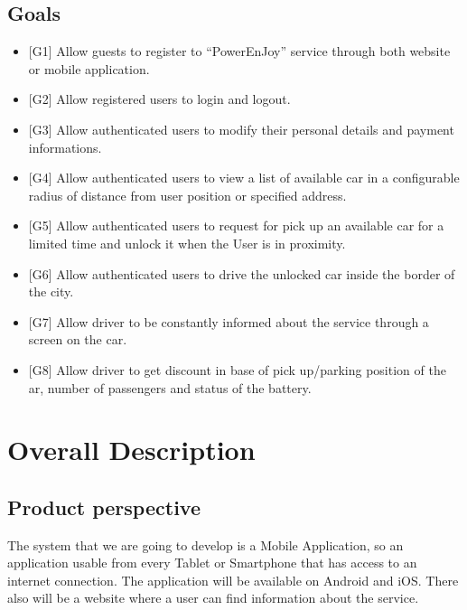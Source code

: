 \documentclass[english]{article}
\begin{document}
\subsection{Goals}
\begin{itemize}
	\item {[}G1{]} Allow guests to register to ``PowerEnJoy'' service through
	both website or mobile application.
	\item {[}G2{]} Allow registered users to login and logout.
	\item {[}G3{]} Allow authenticated users to modify their personal details
	and payment informations.
	\item {[}G4{]} Allow authenticated users to view a list of available car
	in a configurable radius of distance from user position or specified
	address.
	\item {[}G5{]} Allow authenticated users to request for pick up an available
	car for a limited time and unlock it when the User is in proximity.
	\item {[}G6{]} Allow authenticated users to drive the unlocked car inside
	the border of the city.
	\item {[}G7{]} Allow driver to be constantly informed about the service through a screen on the car.
	\item {[}G8{]} Allow driver to get discount in base of pick up/parking
	position of the ar, number of passengers and status of the battery.
\end{itemize}

\pagebreak{}



\section{Overall Description}



\subsection{Product perspective}
The system that we are going to develop is a Mobile Application, so an application usable from every Tablet or Smartphone that has access to an internet connection. The application will be available on Android and iOS. There also will be a website where a user can find information about the service.
\end{document}
